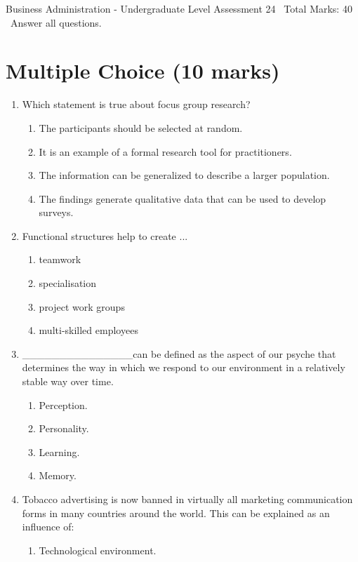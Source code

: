 \documentclass[12pt]{article}
\begin{document}
\begin{center}
Business Administration - Undergraduate Level Assessment 24 \
Total Marks: 40 \
Answer all questions.
\end{center}

\section*{Multiple Choice (10 marks)}
\begin{enumerate}[label=\arabic*.]
\item Which statement is true about focus group research?
\begin{enumerate}[label=(\alph*)]
    \item The participants should be selected at random.
    \item It is an example of a formal research tool for practitioners.
    \item The information can be generalized to describe a larger population.
    \item The findings generate qualitative data that can be used to develop surveys.
\end{enumerate}
\item Functional structures help to create ...
\begin{enumerate}[label=(\alph*)]
    \item teamwork
    \item specialisation
    \item project work groups
    \item multi-skilled employees
\end{enumerate}
\item \_\_\_\_\_\_\_\_\_\_\_\_\_\_\_can be defined as the aspect of our psyche that determines the way in which we respond to our environment in a relatively stable way over time.
\begin{enumerate}[label=(\alph*)]
    \item Perception.
    \item Personality.
    \item Learning.
    \item Memory.
\end{enumerate}
\item Tobacco advertising is now banned in virtually all marketing communication forms in many countries around the world. This can be explained as an influence of:
\begin{enumerate}[label=(\alph*)]
    \item Technological environment.

\end{enumerate}
\end{enumerate}
\end{document}
